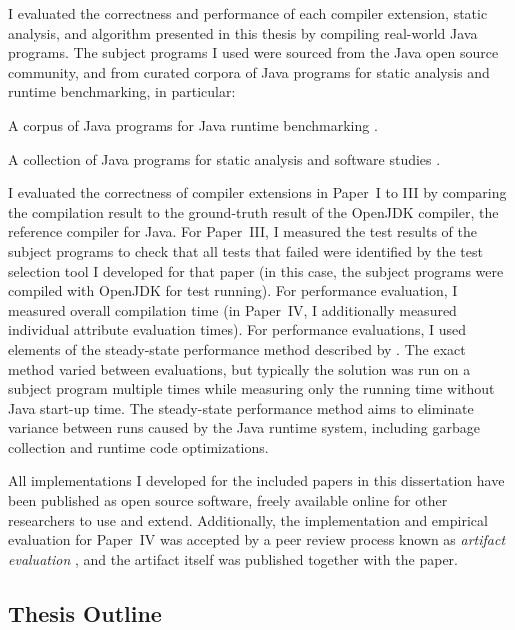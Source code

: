 \documentclass[10pt, twoside, openright]{book}
\begin{document}
I evaluated the correctness and performance of each compiler extension, static analysis,
and algorithm presented in this thesis by compiling real-world Java programs.
The subject programs I used were sourced from the Java open
source community, and from curated corpora of Java programs for static analysis
and runtime benchmarking, in particular:

\begin{description}\raggedright
  \item[DaCapo 2009] A corpus of Java programs for Java runtime benchmarking \cite{DaCapo:paper}.
  \item[Qualitas Corpus 20130901] A collection of Java programs for static analysis
     and software studies \cite{QualitasCorpus:APSEC:2010}.
\end{description}

I evaluated the correctness of compiler extensions in Paper~I to III by comparing the compilation
result to the ground-truth result of the OpenJDK compiler, the reference compiler for Java.
For Paper~III, I measured the test results of the
subject programs to check that all tests that failed were identified by the test selection tool
I developed for that paper (in this case, the subject programs were compiled with OpenJDK for test
running).
For performance evaluation, I measured overall compilation time (in Paper~IV, I additionally measured
individual attribute evaluation times).
For performance evaluations, I used elements of the steady-state performance method described
by \textcite{DBLP:conf/oopsla/GeorgesBE07}. The exact method varied between evaluations, but typically
the solution was run on a subject program multiple times while measuring only the running time
without Java start-up time. The steady-state performance method aims to eliminate
variance between runs caused by the Java runtime system, including garbage collection and runtime code
optimizations.

All implementations I developed for the included papers in this dissertation have been published as open
source software, freely available online for other researchers to use and extend.
Additionally, the implementation and empirical evaluation for Paper~IV was accepted by a peer review
process known as
\emph{artifact evaluation} \cite{Krishnamurthi:2015:RSC:2739250.2658987}, and the artifact itself was
published together with the paper.


\subsection{Thesis Outline}
\end{document}
